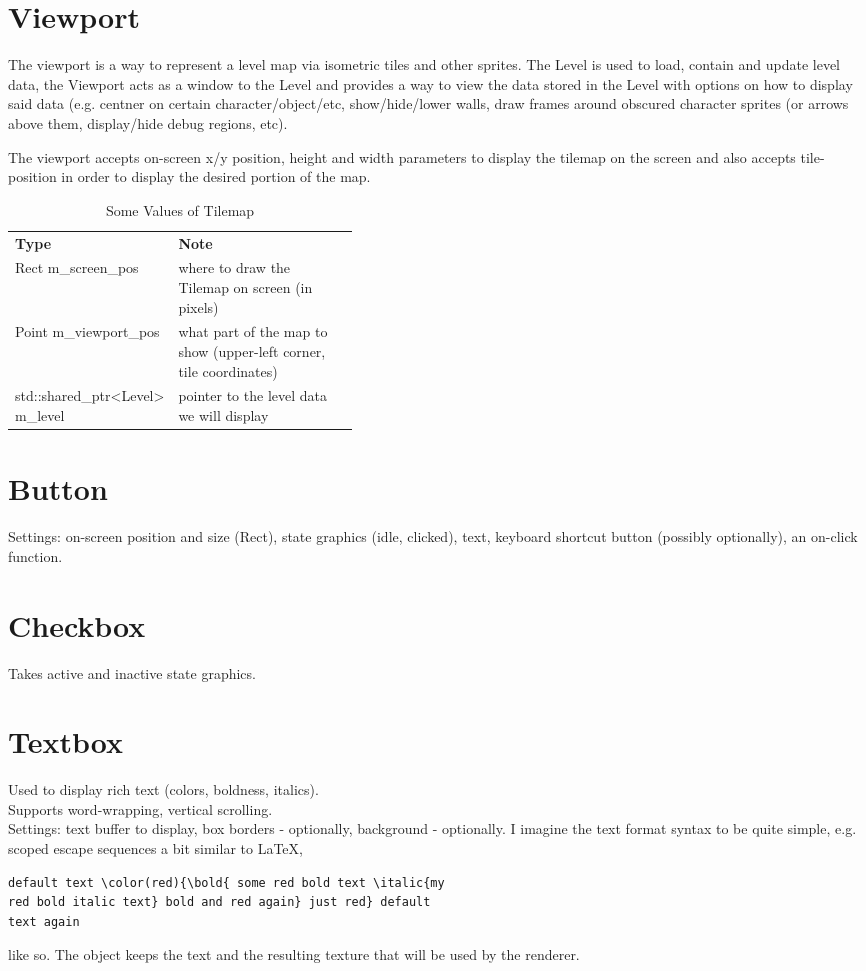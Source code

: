 \documentclass[a4paper,10pt]{book}
\begin{document}
\section{\enginenamespace{}Viewport}
The viewport is a way to represent a level map via isometric tiles and other
sprites.  The \enginenamespace{}Level is used to load, contain and update level
data, the \enginenamespace{}Viewport acts as a window to the Level and provides
a way to view the data stored in the \enginenamespace{}Level with options on
how to display said data (e.g. centner on certain character/object/etc,
show/hide/lower walls, draw frames around obscured character sprites (or arrows
above them, display/hide debug regions, etc).

The viewport accepts on-screen x/y position, height and width parameters to
display the tilemap on the screen and also accepts tile-position in order to
display the desired portion of the map.
\begin{table}[h]
  \caption{Some Values of \enginenamespace{}Tilemap}
  \begin{tabular}{p{0.4\linewidth} p{}}
    \textbf{Type} & \textbf{Note} \\
    \enginenamespace{}Rect m\_screen\_pos & where to draw the Tilemap on screen (in pixels) \\
    \enginenamespace{}Point m\_viewport\_pos & what part of the map to show (upper-left corner,
                                               tile coordinates) \\
    std::shared\_ptr<\enginenamespace{}Level> m\_level & pointer to the level data we will display \\
  \end{tabular}
\end{table}
\section{\enginenamespace{}Button}
Settings: on-screen position and size (Rect), state graphics (idle, clicked),
text, keyboard shortcut button (possibly optionally), an on-click function.
\section{\enginenamespace{}Checkbox}
Takes active and inactive state graphics.
\section{\enginenamespace{}Textbox}
Used to display rich text (colors, boldness, italics). \\
Supports word-wrapping, vertical scrolling. \\
Settings: text buffer to display, box borders - optionally, background -
optionally. I imagine the text format syntax to be quite simple, e.g. scoped
escape sequences a bit similar to LaTeX,
\begin{verbatim}
default text \color(red){\bold{ some red bold text \italic{my
red bold italic text} bold and red again} just red} default
text again
\end{verbatim}
like so.
The object keeps the text and the resulting texture that will be used by the
renderer.
\end{document}
